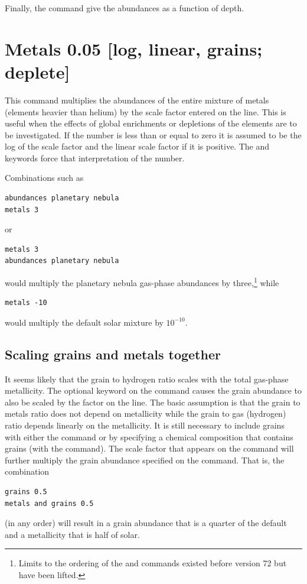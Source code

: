 Finally, the  command give the abundances
as a function of depth.

\section{Metals 0.05 [log, linear, grains; deplete]}

This command multiplies the abundances of the entire mixture of metals
(elements heavier than helium) by the scale factor entered on the line.
This is useful when the effects of global enrichments or depletions of the
elements are to be investigated.  If the number is less than or equal to
zero it is assumed to be the log of the scale factor and the linear scale
factor if it is positive.
The  and  keywords force that
interpretation of the number.

Combinations such as
\begin{verbatim}
abundances planetary nebula
metals 3
\end{verbatim}
or
\begin{verbatim}
metals 3
abundances planetary nebula
\end{verbatim}
would multiply the planetary nebula gas-phase abundances by
three,\footnote{Limits to the ordering of the  and
 commands existed
before version 72 but have been lifted.} while
\begin{verbatim}
metals -10
\end{verbatim}
would multiply the default solar mixture by $10^{-10}$.

\subsection{Scaling grains and metals together}

It seems likely that the grain to hydrogen ratio scales with the total
gas-phase metallicity.
The optional keyword  on the
 command
causes the grain abundance to also be scaled by the factor on the line.
The basic assumption is that the grain to metals ratio does not depend on
metallicity while the grain to gas (hydrogen) ratio depends linearly on
the metallicity.  It is still necessary to include grains with either the
 command or by specifying a chemical composition
that contains grains
(with the  command).
The scale factor that appears on
the 
command will further multiply the grain abundance specified
on the  command.
That is, the combination
\begin{verbatim}
grains 0.5
metals and grains 0.5
\end{verbatim}
(in any order) will result in a grain abundance that is a
quarter of the
default and a metallicity that is half of solar.

